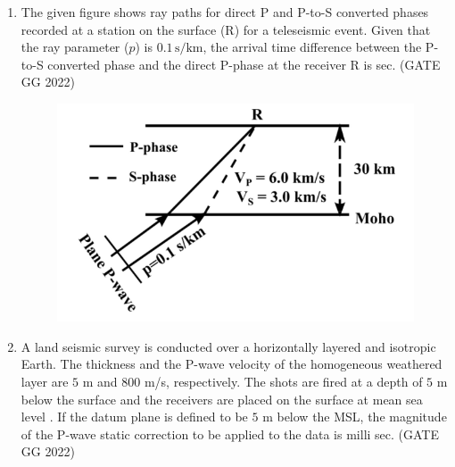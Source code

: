 \documentclass[journal]{IEEEtran}
\begin{document}
\begin{enumerate}
\vspace{0.5cm}

\item The given figure shows ray paths for direct P and P-to-S converted phases 
recorded at a station on the surface (R) for a teleseismic event. Given that the 
ray parameter ($p$) is $0.1 \, \text{s/km}$, the arrival time difference between 
the P-to-S converted phase and the direct P-phase at the receiver R is  \makebox[2cm]{\hrulefill} sec. 
\hfill(GATE GG 2022)
\begin{figure}[H]
\centering
\includegraphics[width = 0.5\columnwidth]{figs/19.png}
\caption*{}
\label{fig:q5}
\end{figure}
\vspace{0.5cm}

\item A land seismic survey is conducted over a horizontally layered and isotropic Earth. The thickness and the P-wave velocity of the homogeneous weathered layer are $5$ m and $800$ m/s, respectively. The shots are fired at a depth of $5$ m below the surface and the receivers are placed on the surface at mean sea level . If the datum plane is defined to be $5$ m below the MSL, the magnitude of the P-wave static correction to be applied to the data is \makebox[2cm]{\hrulefill} milli sec.  
\hspace*{15.7cm}(GATE GG 2022)

\end{enumerate}
\end{document}
